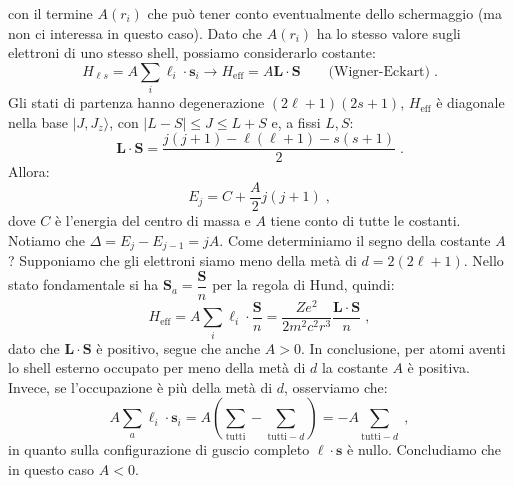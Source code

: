 \documentclass[12pt,a4paper]{report}
\theoremstyle{definition}
\numberwithin{equation}{section}
\newcommand{\ket}{\rangle}
\begin{document}
con il termine $A(r_i)$ che può tener conto eventualmente dello schermaggio (ma non ci interessa in questo caso). Dato che $A(r_i)$ ha lo stesso valore sugli elettroni di uno stesso shell, possiamo considerarlo costante:
\begin{equation}
H_{\ell s}=A\sum_i\boldsymbol{\ell}_i\cdot\mathbf{s}_i\longrightarrow H_{\mathrm{eff}}=A\mathbf{L}\cdot\mathbf{S}\qquad \mbox{(Wigner-Eckart)}\;.
\end{equation}
Gli stati di partenza hanno degenerazione $(2\ell+1)(2s+1)$, $H_{\mathrm{eff}}$ è diagonale nella base $|J,J_z\ket$, con $|L-S|\le J\le L+S$ e, a fissi $L,S$:
$$
\mathbf{L}\cdot\mathbf{S}=\frac{j(j+1)-\ell(\ell+1)-s(s+1)}{2}\;.
$$
Allora:
\begin{equation}
E_j=C+\frac{A}{2}j(j+1)\;,
\end{equation}
dove $C$ è l'energia del centro di massa e $A$ tiene conto di tutte le costanti. Notiamo che $\Delta=E_j-E_{j-1}=jA$. Come determiniamo il segno della costante $A$? Supponiamo che gli elettroni siamo meno della metà di $d=2(2\ell+1)$. Nello stato fondamentale si ha $\mathbf{S}_a=\dfrac{\mathbf{S}}{n}$ per la regola di Hund, quindi:
\begin{equation}
H_{\mathrm{eff}}=A\sum_i\boldsymbol{\ell}_i\cdot\frac{\mathbf{S}}{n}=\frac{Ze^2}{2m^2c^2r^3}\frac{\mathbf{L}\cdot\mathbf{S}}{n}\;,
\end{equation}
dato che $\mathbf{L}\cdot\mathbf{S}$ è positivo, segue che anche $A>0$. In conclusione, per atomi aventi lo shell esterno occupato per meno della metà di $d$ la costante $A$ è positiva. Invece, se l'occupazione è più della metà di $d$, osserviamo che:
\begin{equation}
A\sum_a\boldsymbol{\ell}_i\cdot\mathbf{s}_i=A\left(\sum_{\mathrm{tutti}}-\sum_{\mathrm{tutti}-d}\right)=-A\sum_{\mathrm{tutti}-d}\;,
\end{equation}
in quanto sulla configurazione di guscio completo $\boldsymbol{\ell}\cdot\mathbf{s}$ è nullo. Concludiamo che in questo caso $A<0$.
\end{document}
